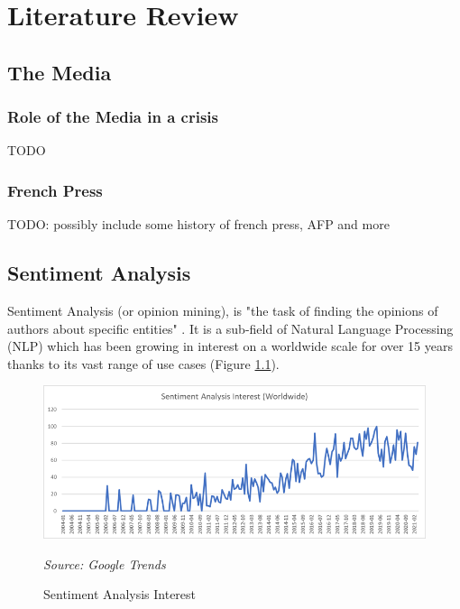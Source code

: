 \chapter{Literature Review}\label{Literature Review}

\section{The Media}

\subsection{Role of the Media in a crisis}\label{Role of the Media in a crisis}

TODO

\subsection{French Press}\label{chap:French Press}

TODO: possibly include some history of french press, AFP and more

\section{Sentiment Analysis}\label{Sentiment Analysis}

Sentiment Analysis (or opinion mining), is "the task of finding the opinions of authors about specific entities" \citep{feldman2013techniques}. It is a sub-field of Natural Language Processing (NLP) which has been growing in interest on a worldwide scale for over 15 years thanks to its vast range of use cases (Figure \ref{fig:sentiment interest}).

\begin{figure}[h!]
      \centering
      \includegraphics[scale=0.65]{lit_review/sentiment_analysis_interest.png}
      \caption{Sentiment Analysis Interest}
      \label{fig:sentiment interest}
      \emph{Source: Google Trends}
\end{figure}

